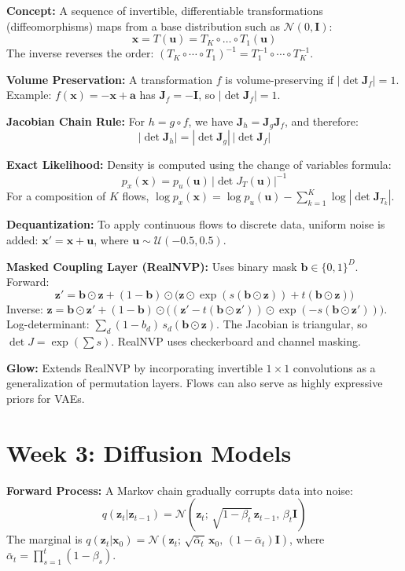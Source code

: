\documentclass[12pt]{article}
\begin{document}
\textbf{Concept:} A sequence of invertible, differentiable transformations (diffeomorphisms) maps from a base distribution such as $\mathcal{N}(0, \bm{I})$:
\[
\bm{x} = T(\bm{u}) = T_K \circ \dots \circ T_1(\bm{u})
\]
The inverse reverses the order: $(T_K \circ \cdots \circ T_1)^{-1} = T_1^{-1} \circ \cdots \circ T_K^{-1}$.

\textbf{Volume Preservation:} A transformation $f$ is volume-preserving if $|\det \bm{J}_f| = 1$. Example: $f(\bm{x}) = -\bm{x} + \bm{a}$ has $\bm{J}_f = -\bm{I}$, so $|\det \bm{J}_f| = 1$.

\textbf{Jacobian Chain Rule:} For $h = g \circ f$, we have $\bm{J}_h = \bm{J}_g \bm{J}_f$, and therefore:
\[
|\det \bm{J}_h| = |\det \bm{J}_g|\,|\det \bm{J}_f|
\]

\textbf{Exact Likelihood:} Density is computed using the change of variables formula:
\[
p_x(\bm{x}) = p_u(\bm{u}) \,|\det J_T(\bm{u})|^{-1}
\]
For a composition of $K$ flows, $\log p_x(\bm{x}) = \log p_u(\bm{u}) - \sum_{k=1}^K \log|\det \bm{J}_{T_k}|$.

\textbf{Dequantization:} To apply continuous flows to discrete data, uniform noise is added: $\bm{x}' = \bm{x} + \bm{u}$, where $\bm{u} \sim \mathcal{U}(-0.5, 0.5)$.

\textbf{Masked Coupling Layer (RealNVP):} Uses binary mask $\bm{b} \in \{0,1\}^D$. Forward:
\[
\bm{z}' = \bm{b} \odot \bm{z} + (1-\bm{b}) \odot \bigl(\bm{z} \odot \exp(s(\bm{b}\odot\bm{z})) + t(\bm{b}\odot\bm{z})\bigr)
\]
Inverse: $\bm{z} = \bm{b} \odot \bm{z}' + (1-\bm{b}) \odot \bigl((\bm{z}' - t(\bm{b}\odot\bm{z}'))\odot\exp(-s(\bm{b}\odot\bm{z}'))\bigr)$. Log-determinant: $\sum_d (1-b_d)\,s_d(\bm{b}\odot\bm{z})$. The Jacobian is triangular, so $\det J = \exp(\sum s)$. RealNVP uses checkerboard and channel masking.

\textbf{Glow:} Extends RealNVP by incorporating invertible $1\times1$ convolutions as a generalization of permutation layers. Flows can also serve as highly expressive priors for VAEs.

\section*{Week 3: Diffusion Models}

\textbf{Forward Process:} A Markov chain gradually corrupts data into noise:
\[
q(\bm{z}_t|\bm{z}_{t-1}) = \mathcal{N}(\bm{z}_t;\, \sqrt{1-\beta_t}\,\bm{z}_{t-1},\, \beta_t \bm{I})
\]
The marginal is $q(\bm{z}_t|\bm{x}_0) = \mathcal{N}(\bm{z}_t;\, \sqrt{\bar{\alpha}_t}\,\bm{x}_0,\, (1-\bar{\alpha}_t)\bm{I})$, where $\bar{\alpha}_t = \prod_{s=1}^t (1-\beta_s)$.
\end{document}
